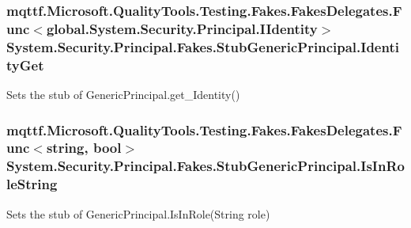 \hypertarget{class_system_1_1_security_1_1_principal_1_1_fakes_1_1_stub_generic_principal_a54c442e43327e371c20db16db50ca5f6}{
\subsubsection[{Identity\-Get}]{\setlength{\rightskip}{0pt plus 5cm}mqttf.\-Microsoft.\-Quality\-Tools.\-Testing.\-Fakes.\-Fakes\-Delegates.\-Func$<$global.\-System.\-Security.\-Principal.\-I\-Identity$>$ System.\-Security.\-Principal.\-Fakes.\-Stub\-Generic\-Principal.\-Identity\-Get}}\label{class_system_1_1_security_1_1_principal_1_1_fakes_1_1_stub_generic_principal_a54c442e43327e371c20db16db50ca5f6}


Sets the stub of Generic\-Principal.\-get\-\_\-\-Identity()

\hypertarget{class_system_1_1_security_1_1_principal_1_1_fakes_1_1_stub_generic_principal_a56cf239a2c1784fb9563e0004c002cdf}{
\subsubsection[{Is\-In\-Role\-String}]{\setlength{\rightskip}{0pt plus 5cm}mqttf.\-Microsoft.\-Quality\-Tools.\-Testing.\-Fakes.\-Fakes\-Delegates.\-Func$<$string, bool$>$ System.\-Security.\-Principal.\-Fakes.\-Stub\-Generic\-Principal.\-Is\-In\-Role\-String}}\label{class_system_1_1_security_1_1_principal_1_1_fakes_1_1_stub_generic_principal_a56cf239a2c1784fb9563e0004c002cdf}


Sets the stub of Generic\-Principal.\-Is\-In\-Role(\-String role)



